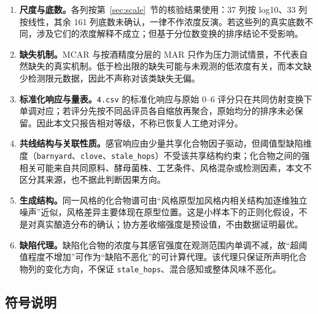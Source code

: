 \documentclass[UTF8,a4paper,zihao=-4]{ctexart}
\numberwithin{figure}{section}
\numberwithin{table}{section}
\numberwithin{equation}{section}
\newcommand{\file}[1]{\texttt{#1}}
\begin{document}
\begin{enumerate}[label=\textbf{\arabic*},leftmargin=3em,itemsep=2pt,topsep=2pt,parsep=0pt]
 
  \item \textbf{尺度与底数。}各列按第~\ref{sec:scale}~节的核验结果使用：37 列按 log10、33 列按线性，其余 161 列底数未确认，一律不作浓度反演。若这些列的真实底数不同，涉及它们的浓度解释不成立；但基于分位数变换的排序结论不受影响。

  \item \textbf{缺失机制。}MCAR 与按酒精度分层的 MAR 只作为压力测试情景，不代表自然缺失的真实机制。低于检出限的缺失可能与未观测的低浓度有关，而本文缺少检测限元数据，因此不声称对该类缺失无偏。

  \item \textbf{标准化响应与量表。}\file{4.csv} 的标准化响应与原始 0--6 评分只在共同仿射变换下单调对应；若评分先按不同品评员各自缩放再聚合，原始均分的排序未必保留。因此本文只报告相对等级，不称已恢复人工绝对评分。

  \item \textbf{共线结构与关联性质。}感官响应由少量共享化合物因子驱动，但阈值型缺陷维度（\file{barnyard}、\file{clove}、\file{stale\_hops}）不受该共享结构约束；化合物之间的强相关可能来自共同原料、酵母菌株、工艺条件、风格混杂或检测因素，本文不区分其来源，也不据此判断因果方向。

  \item \textbf{生成结构。}同一风格的化合物谱可由“风格原型加风格内相关结构加逐维独立噪声”近似，风格差异主要体现在原型位置。这是小样本下的正则化假设，不是对真实酿造分布的确认；协方差收缩强度是预设值，不由数据证明最优。

  \item \textbf{缺陷代理。}缺陷化合物的浓度与其感官强度在观测范围内单调不减，故“超阈值程度不增加”可作为“缺陷不恶化”的可计算代理。该代理只保证所声明化合物列的变化方向，不保证 \file{stale\_hops}、混合感知或整体风味不恶化。
\end{enumerate}

\subsection{符号说明}
\end{document}
